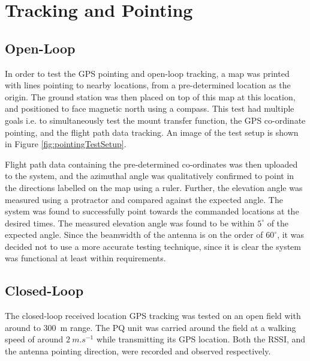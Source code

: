 \graphicspath{{./figures}}

\section{Tracking and Pointing}

\subsection{Open-Loop}

In order to test the GPS pointing and open-loop tracking, a map was printed with lines pointing to nearby locations, from a pre-determined location as the origin. The ground station was then placed on top of this map at this location, and positioned to face magnetic north using a compass. This test had multiple goals i.e. to simultaneously test the mount transfer function, the GPS co-ordinate pointing, and the flight path data tracking. An image of the test setup is shown in Figure \ref{fig:pointingTestSetup}.

Flight path data containing the pre-determined co-ordinates was then uploaded to the system, and the azimuthal angle was qualitatively confirmed to point in the directions labelled on the map using a ruler. Further, the elevation angle was measured using a protractor and compared against the expected angle. The system was found to successfully point towards the commanded locations at the desired times. The measured elevation angle was found to be within $5^\circ$ of the expected angle. Since the beamwidth of the antenna is on the order of $60^\circ$, it was decided not to use a more accurate testing technique, since it is clear the system was functional at least within requirements.

\subsection{Closed-Loop}\label{sec:closed_loop_testing}
The closed-loop received location GPS tracking was tested on an open field with around to \SI{300}{m} range. The PQ unit was carried around the field at a walking speed of around $\SI{2}{m.s^{-1}} $ while transmitting its GPS location. Both the RSSI, and the antenna pointing direction, were recorded and observed respectively.

